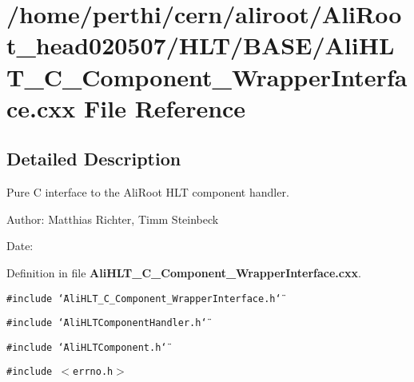 \section{/home/perthi/cern/aliroot/Ali\-Root\_\-head020507/HLT/BASE/Ali\-HLT\_\-C\_\-Component\_\-Wrapper\-Interface.cxx File Reference}
\label{AliHLT__C__Component__WrapperInterface_8cxx}


\subsection{Detailed Description}
Pure C interface to the Ali\-Root HLT component handler. 

\begin{Desc}
\item[Author:]Matthias Richter, Timm Steinbeck \end{Desc}
\begin{Desc}
\item[Date:]\end{Desc}


Definition in file {\bf Ali\-HLT\_\-C\_\-Component\_\-Wrapper\-Interface.cxx}.

{\tt \#include \char`\"{}Ali\-HLT\_\-C\_\-Component\_\-Wrapper\-Interface.h\char`\"{}}\par
{\tt \#include \char`\"{}Ali\-HLTComponent\-Handler.h\char`\"{}}\par
{\tt \#include \char`\"{}Ali\-HLTComponent.h\char`\"{}}\par
{\tt \#include $<$errno.h$>$}\par
